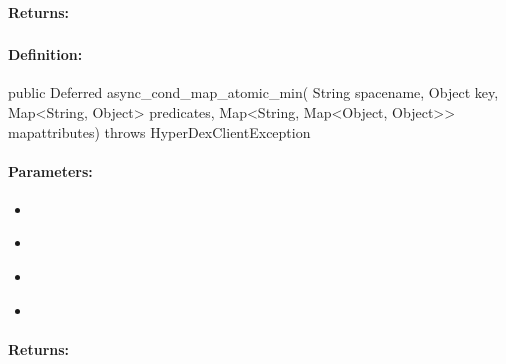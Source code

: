 \paragraph{Returns:}


\pagebreak
\subsubsection{}
\label{api:java:async_cond_map_atomic_min}


\paragraph{Definition:}
\begin{javacode}
public Deferred async_cond_map_atomic_min(
        String spacename,
        Object key,
        Map<String, Object> predicates,
        Map<String, Map<Object, Object>> mapattributes) throws HyperDexClientException
\end{javacode}

\paragraph{Parameters:}
\begin{itemize}[noitemsep]
\item {}\\

\item {}\\

\item {}\\

\item {}\\

\end{itemize}

\paragraph{Returns:}


